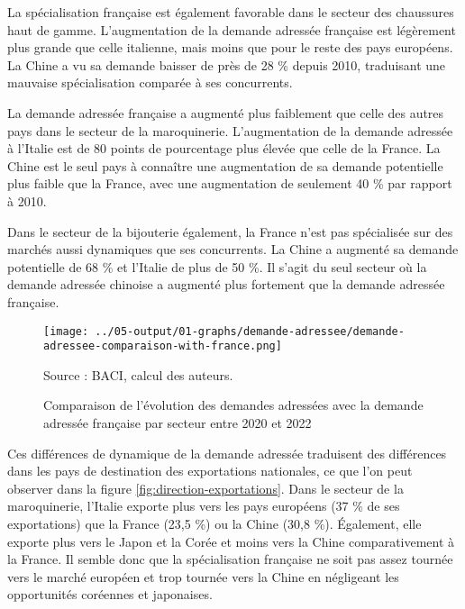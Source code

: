 \documentclass[french,10pt,a4paper]{article}
\begin{document}
La spécialisation française est également favorable dans le secteur des chaussures haut de gamme. L'augmentation de la demande adressée française est légèrement plus grande que celle italienne, mais moins que pour le reste des pays européens. La Chine a vu sa demande baisser de près de 28 \% depuis 2010, traduisant une mauvaise spécialisation comparée à ses concurrents.

La demande adressée française a augmenté plus faiblement que celle des autres pays dans le secteur de la maroquinerie. L'augmentation de la demande adressée à l'Italie est de 80 points de pourcentage plus élevée que celle de la France. La Chine est le seul pays à connaître une augmentation de sa demande potentielle plus faible que la France, avec une augmentation de seulement 40 \% par rapport à 2010.

Dans le secteur de la bijouterie également, la France n'est pas spécialisée sur des marchés aussi dynamiques que ses concurrents. La Chine a augmenté sa demande potentielle de 68 \% et l'Italie de plus de 50 \%. Il s'agit du seul secteur où la demande adressée chinoise a augmenté plus fortement que la demande adressée française.


\begin{figure}[!h]
  \centering
  \texttt{[image: ../05-output/01-graphs/demande-adressee/demande-adressee-comparaison-with-france.png]}
  \captionsetup{justification=raggedright,singlelinecheck=false, font=small}
  \caption*{Source : BACI, calcul des auteurs.}
  \captionsetup{justification=centering, singlelinecheck=true, font=normalsize}
  \caption{Comparaison de l'évolution des demandes adressées avec la demande adressée française par secteur entre 2020 et 2022}
  \label{fig:demande-adressee}
\end{figure}

\bigskip

Ces différences de dynamique de la demande adressée traduisent des différences dans les pays de destination des exportations nationales, ce que l'on peut observer dans la figure \ref{fig:direction-exportations}. Dans le secteur de la maroquinerie, l'Italie exporte plus vers les pays européens (37 \% de ses exportations) que la France (23,5 \%) ou la Chine (30,8 \%). Également, elle exporte plus vers le Japon et la Corée et moins vers la Chine comparativement à la France. Il semble donc que la spécialisation française ne soit pas assez tournée vers le marché européen et trop tournée vers la Chine en négligeant les opportunités coréennes et japonaises.
\end{document}
